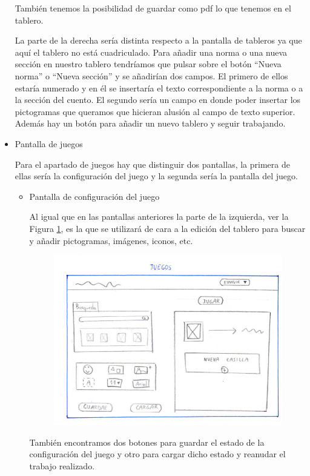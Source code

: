 \begin{itemize}
	También tenemos la posibilidad de guardar como pdf lo que tenemos en el tablero.
	
	
	La parte de la derecha sería distinta respecto a la pantalla de tableros ya que aquí el tablero no está cuadriculado. Para añadir una norma o una nueva sección en nuestro tablero tendríamos que pulsar sobre el botón “Nueva norma” o “Nueva sección” y se añadirían dos campos. El primero de ellos estaría numerado y en él se insertaría el texto correspondiente a la norma o a la sección del cuento. El segundo sería un campo en donde poder insertar los pictogramas que queramos que hicieran alusión al campo de texto superior. Además hay  un botón para añadir un nuevo tablero y seguir trabajando.
	
	
	\item Pantalla de juegos
	
	Para el apartado de juegos hay que distinguir dos pantallas, la primera de ellas sería la configuración del juego y la segunda sería la pantalla del juego.
	
	\begin{itemize}
		\item Pantalla de configuración del juego
		
		Al igual que en las pantallas anteriores la parte de la izquierda, ver la Figura \ref{fig:juegosjorge}, es la que se utilizará de cara a la edición del tablero para buscar  y añadir pictogramas, imágenes, iconos, etc.
		
		\begin{figure}[h!]
			\centering
			\includegraphics[width=0.7\linewidth]{Imagenes/Bitmap/juegosJorge}
			\caption{}
			\label{fig:juegosjorge}
		\end{figure}
		
		También encontramos dos botones para guardar el estado de la configuración del juego y otro para cargar dicho estado y reanudar el trabajo realizado.
		

\end{itemize}
\end{itemize}
